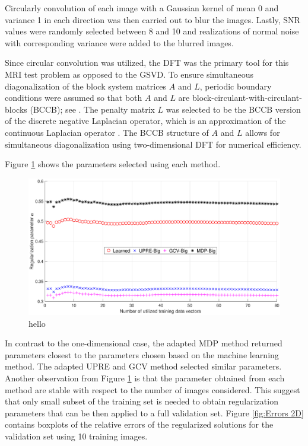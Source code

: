 \documentclass[12pt]{article}
\begin{document}
Circularly convolution of each image with a Gaussian kernel of mean 0 and variance 1 in each direction was then carried out to blur the images. Lastly, SNR values were randomly selected between 8 and 10 and realizations of normal noise with corresponding variance were added to the blurred images. \par 
Since circular convolution was utilized, the DFT was the primary tool for this MRI test problem as opposed to the GSVD. To ensure simultaneous diagonalization of the block system matrices $A$ and $L$, periodic boundary conditions were assumed so that both $A$ and $L$ are block-circulant-with-circulant-blocks (BCCB); see \cite{NeumannDCT,Vogel:2002}. The penalty matrix $L$ was selected to be the BCCB version of the discrete negative Laplacian operator, which is an approximation of the continuous Laplacian operator \cite{DebnathMikusinski2005,LeVeque2007}. The BCCB structure of $A$ and $L$ allows for simultaneous diagonalization using two-dimensional DFT for numerical efficiency. \par 
Figure \ref{fig:Parameters 2D} shows the parameters selected using each method. 
\begin{figure}[ht]
\includegraphics[scale=0.36]{Figures/Parameters2D_mri}
\caption{hello}
\label{fig:Parameters 2D}
\end{figure}
In contrast to the one-dimensional case, the adapted MDP method returned parameters closest to the parameters chosen based on the machine learning method. The adapted UPRE and GCV method selected similar parameters. Another observation from Figure \ref{fig:Parameters 2D} is that the parameter obtained from each method are stable with respect to the number of images considered. This suggest that only small subset of the training set is needed to obtain regularization parameters that can be then applied to a full validation set. Figure \ref{fig:Errors 2D} contains boxplots of the relative errors of the regularized solutions for the validation set using 10 training images. 
\end{document}
